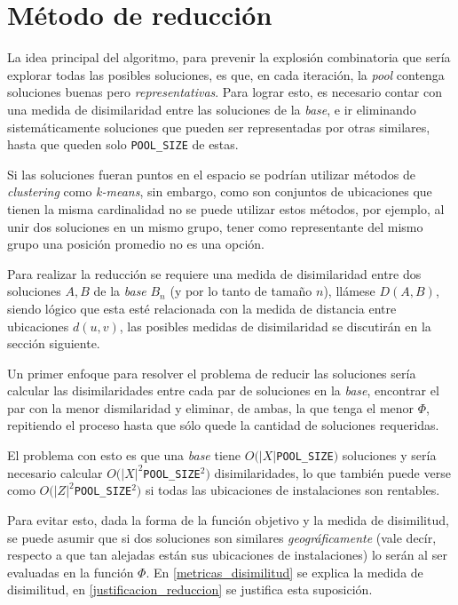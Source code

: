 \section{Método de reducción}

La idea principal del algoritmo, para prevenir la explosión combinatoria que sería explorar todas las posibles soluciones, es que, en cada iteración, la \emph{pool} contenga soluciones buenas pero \emph{representativas}. Para lograr esto, es necesario contar con una medida de disimilaridad entre las soluciones de la \emph{base}, e ir eliminando sistemáticamente soluciones que pueden ser representadas por otras similares, hasta que queden solo \texttt{POOL\_SIZE} de estas.

Si las soluciones fueran puntos en el espacio se podrían utilizar métodos de \emph{clustering} como \emph{k-means}, sin embargo, como son conjuntos de ubicaciones que tienen la misma cardinalidad no se puede utilizar estos métodos, por ejemplo, al unir dos soluciones en un mismo grupo, tener como representante del mismo grupo una posición promedio no es una opción.

Para realizar la reducción se requiere una medida de disimilaridad entre dos soluciones $A,B$ de la \emph{base} $B_n$ (y por lo tanto de tamaño $n$), llámese $D(A,B)$, siendo lógico que esta esté relacionada con la medida de distancia entre ubicaciones $d(u,v)$, las posibles medidas de disimilaridad se discutirán en la sección siguiente.

Un primer enfoque para resolver el problema de reducir las soluciones sería calcular las disimilaridades entre cada par de soluciones en la \emph{base}, encontrar el par con la menor dismilaridad y eliminar, de ambas, la que tenga el menor $\Phi$, repitiendo el proceso hasta que sólo quede la cantidad de soluciones requeridas.

El problema con esto es que una \emph{base} tiene $O(|X|$\texttt{POOL\_SIZE}$)$ soluciones y sería necesario calcular $O({|X|}^2$\texttt{POOL\_SIZE}$^2)$ disimilaridades, lo que también puede verse como $O({|Z|}^2$\texttt{POOL\_SIZE}$^2)$ si todas las ubicaciones de instalaciones son rentables.

Para evitar esto, dada la forma de la función objetivo y la medida de disimilitud, se puede asumir que si dos soluciones son similares \emph{geográficamente} (vale decír, respecto a que tan alejadas están sus ubicaciones de instalaciones) lo serán al ser evaluadas en la función $\Phi$. En
\ref{metricas_disimilitud} se explica la medida de disimilitud, en \ref{justificacion_reduccion} se justifica esta suposición.

